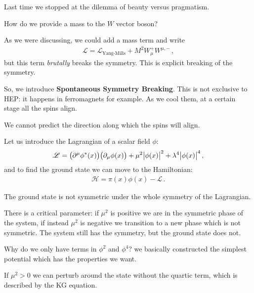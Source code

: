 \documentclass[main.tex]{subfiles}
\begin{document}

Last time we stopped at the dilemma of beauty versus pragmatism.

How do we provide a mass to the \(W\) vector boson? 


As we were discussing, we could add a mass term and write 
%
\begin{align}
\mathscr{L} = \mathscr{L} _{\text{Yang-Mills}} + M^2 W^{+}_{\mu } W^{\mu, -}
\,,
\end{align}
%
but this term \emph{brutally} breaks the symmetry.
This is explicit breaking of the symmetry. 

So, we introduce \textbf{Spontaneous Symmetry Breaking}. 
This is not exclusive to HEP: it happens in ferromagnets for example. As we cool them, at a certain stage all the spins align.

We cannot predict the direction along which the spins will align.

Let us introduce the Lagrangian of a scalar field \(\phi \): 
%
\begin{align}
\mathscr{L} = \qty(\partial^{\mu  } \phi^{*}(x)) \qty(\partial_{\mu } \phi (x)) 
+ \mu^2 \abs{\phi (x)}^2
+ \lambda^{4} \abs{\phi (x)}^{4}
\,,
\end{align}
%
and to find the ground state we can move to the Hamiltonian: 
%
\begin{align}
\mathscr{H} = \pi(x) \phi (x) - \mathscr{L}
\,.
\end{align}


The ground state is not symmetric under the whole symmetry of the Lagrangian.

There is a critical parameter: if \(\mu^2\) is positive we are in the symmetric phase of the system, if instead \(\mu^2\) is negative we transition to a new phase which is not symmetric.
The system still has the symmetry, but the ground state does not.

Why do we only have terms in \(\phi^2\) and \(\phi^{4}\)? we basically constructed the simplest potential which has the properties we want.

If \(\mu^2>0\) we can perturb around the state without the quartic term, which is described by the KG equation.
\end{document}
